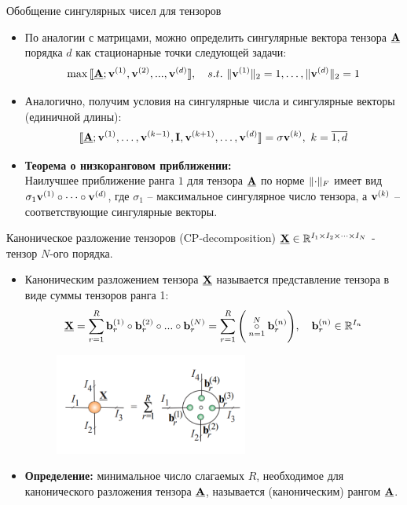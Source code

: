 \begin{frame}{Обобщение сингулярных чисел для тензоров}

\begin{itemize}
    \item  По аналогии с матрицами, можно определить сингулярные вектора тензора $\underline{\textbf{A}}$ порядка $d$ как стационарные точки следующей задачи:
    $$ \max{\llbracket \tensor{A}; \M{v}^{(1)}, \M{v}^{(2)},...,\M{v}^{(d)}\rrbracket}, \quad s.t. \ \norm{\M{v}^{(1)}}_2 = 1, \dots, \norm{\M{v}^{(d)}}_2 = 1 $$
    \item Аналогично, получим условия на сингулярные числа и сингулярные векторы (единичной длины):
    $$ \llbracket \underline{\textbf{A}}; \textbf{v}^{(1)}, \dots, \textbf{v}^{(k-1)}, \textbf{I}, \textbf{v}^{(k+1)}, \dots, \textbf{v}^{(d)}\rrbracket = \sigma \textbf{v}^{(k)}, \ k = \overline{1,d}$$
    \item \textbf{Теорема о низкоранговом приближении:} \\
    Наилучшее приближение ранга $1$ для тензора $\underline{\textbf{A}}$ по норме $\lVert \cdot \rVert_F$ имеет вид $\sigma_1 \textbf{v}^{(1)} \circ \dots \circ \textbf{v}^{(d)}$, где $\sigma_1$ -- максимальное сингулярное число тензора, а $\textbf{v}^{(k)}$ -- соответствующие сингулярные векторы. 
    
\end{itemize}

\end{frame}
\begin{frame}{Каноническое разложение тензоров (CP-decomposition)}
\vspace{0.1cm}
$\underline{\textbf{X}} \in \mathbb{R}^{I_1 \times I_2 \times \dots \times I_N}$ - тензор $N$-ого порядка.
\begin{itemize}
    \item Каноническим разложением тензора $\underline{\textbf{X}}$ называется представление тензора в виде суммы тензоров ранга 1:
    $$ \underline{\textbf{X}} = \sum_{r=1}^R \textbf{b}_r^{(1)} \circ \textbf{b}_r^{(2)} \circ ... \circ \textbf{b}_r^{(N)} = \sum_{r=1}^R \Bigg( \overset{N}{\underset{n = 1}{\circ}} \textbf{b}_r^{(n)} \Bigg), \quad \textbf{b}_r^{(n)} \in \mathbb{R}^{I_n}$$


\begin{figure}
    \centering
    \includegraphics[width=0.6\textwidth]{lecture_11/figs/cp_decomp.png}
\end{figure}

\item \textbf{Определение:} минимальное число слагаемых $R$, необходимое для канонического разложения тензора $\underline{\textbf{A}}$, называется (каноническим) рангом $\underline{\textbf{A}}$.
\end{itemize}




\end{frame}
